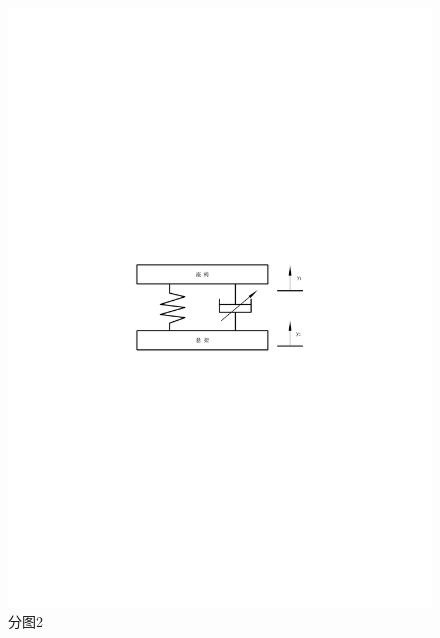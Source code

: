 \begin{figure}[!htbp]
\begin{center}
\begin{minipage}[c]{0.56\textwidth}
			\centering		\includegraphics{pic/fig2-2}
			\caption{分图2}	\label{fig2-2}
		\end{minipage}
	\end{center}
\end{figure} 


